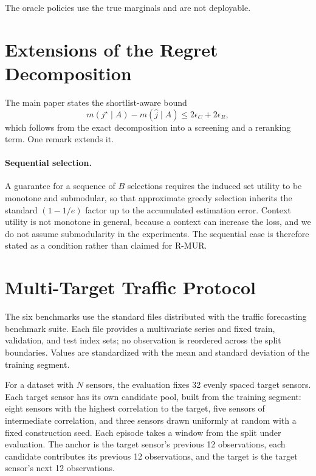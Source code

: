 \documentclass[preprint,12pt]{elsarticle}
\newcommand{\marginal}{m}
\begin{document}
The oracle policies use the true marginals and are not deployable.

\section{Extensions of the Regret Decomposition}
\label{sec:supp-proofs}

The main paper states the shortlist-aware bound
\begin{equation}
 \marginal(j^\star\mid A)-\marginal(\widehat{j}\mid A)\le 2\epsilon_C+2\epsilon_R ,
\end{equation}
which follows from the exact decomposition into a screening and a reranking
term. One remark extends it.

\paragraph{Sequential selection.}
A guarantee for a sequence of $B$ selections requires the induced set utility
to be monotone and submodular, so that approximate greedy selection inherits
the standard $(1-1/e)$ factor up to the accumulated estimation error. Context
utility is not monotone in general, because a context can increase the loss,
and we do not assume submodularity in the experiments. The sequential case is
therefore stated as a condition rather than claimed for R-MUR.

\section{Multi-Target Traffic Protocol}

The six benchmarks use the standard files distributed with the traffic
forecasting benchmark suite. Each file provides a multivariate series and
fixed train, validation, and test index sets; no observation is reordered
across the split boundaries. Values are standardized with the mean and standard
deviation of the training segment.

For a dataset with $N$ sensors, the evaluation fixes 32 evenly spaced target
sensors. Each target sensor has its own candidate pool, built from the training
segment: eight sensors with the highest correlation to the target, five sensors
of intermediate correlation, and three sensors drawn uniformly at random with a
fixed construction seed. Each episode takes a window from the split under
evaluation. The anchor is the target sensor's previous 12 observations, each
candidate contributes its previous 12 observations, and the target is the
target sensor's next 12 observations.
\end{document}
